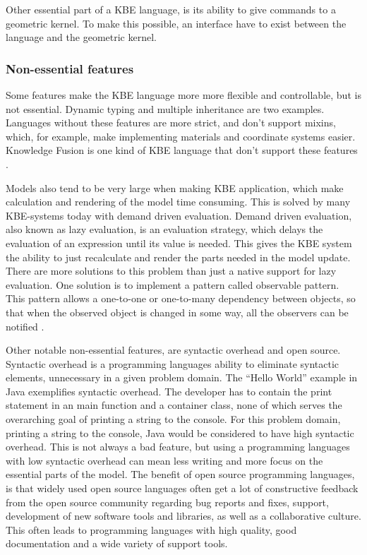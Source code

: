 Other essential part of a KBE language, is its ability to give commands to a geometric kernel. To make this possible, an interface have to exist between the language and the geometric kernel.


\subsubsection{Non-essential features} %
\label{ssub:non_essential_features}
Some features make the KBE language more more flexible and controllable, but is not essential. Dynamic typing and multiple inheritance are two examples. Languages without these features are more strict, and don't support mixins, which, for example, make implementing materials and coordinate systems easier. Knowledge Fusion is one kind of KBE language that don't support these features \citep{rocca}.

Models also tend to be very large when making KBE application, which make calculation and rendering of the model time consuming. This is solved by many KBE-systems today with demand driven evaluation. Demand driven evaluation, also known as lazy evaluation, is an evaluation strategy, which delays the evaluation of an expression until its value is needed. This gives the KBE system the ability to just recalculate and render the parts needed in the model update. There are more solutions to this problem than just a native support for lazy evaluation. One solution is to implement a pattern called observable pattern. This pattern allows a one-to-one or one-to-many dependency between objects, so that when the observed object is changed in some way, all the observers can be notified \citep{rollings}.

Other notable non-essential features, are syntactic overhead and open source. Syntactic overhead is a programming languages ability to eliminate syntactic elements, unnecessary in a given problem domain. The \enquote{Hello World} example in Java exemplifies syntactic overhead. The developer has to contain the print statement in an main function and a container class, none of which serves the overarching goal of printing a string to the console. For this problem domain, printing a string to the console, Java would be considered to have high syntactic overhead. This is not always a bad feature, but using a programming languages with low syntactic overhead can mean less writing and more focus on the essential parts of the model. The benefit of open source programming languages, is that widely used open source languages often get a lot of constructive feedback from the open source community regarding bug reports and fixes, support, development of new software tools and libraries, as well as a collaborative culture. This often leads to programming languages with high quality, good documentation and a wide variety of support tools.

